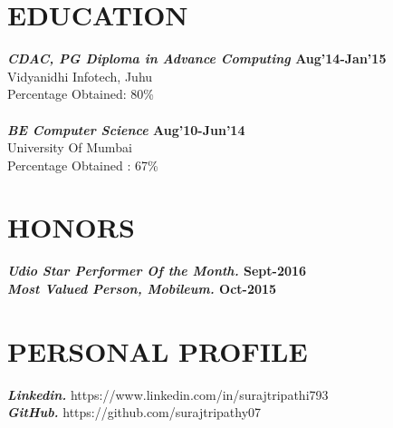 \documentclass[line, margin]{res}
\begin{document}
\begin{resume}
\section{EDUCATION} 
\textbf{\textit{CDAC, PG Diploma in Advance Computing} \hfill Aug'14-Jan'15} \\
Vidyanidhi Infotech, Juhu \\
Percentage Obtained: 80\% \\
\\
\textbf{\textit{BE Computer Science} \hfill Aug'10-Jun'14} \\
University Of Mumbai \\
Percentage Obtained : 67\% \\
\section{HONORS}
\textbf{\textit{Udio Star Performer Of the Month.} \hfill Sept-2016} \\ 
\textbf{\textit{Most Valued Person, Mobileum.} \hfill Oct-2015} \\ 
\section{PERSONAL PROFILE}

\textbf{\textit{Linkedin.}} https://www.linkedin.com/in/surajtripathi793 \\
\textbf{\textit{GitHub.}} https://github.com/surajtripathy07  \\
\end{resume}
\end{document}

